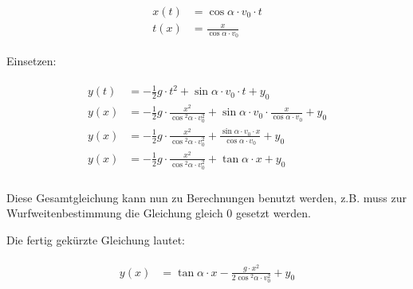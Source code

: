 \begin{align}
\begin{split}
	x(t) &= \cos{\alpha} \cdot v_0 \cdot t \\
	t(x) &= \frac{x}{\cos{\alpha} \cdot v_0}
\end{split}
\end{align}

\noindent Einsetzen:

\begin{align}
\begin{split}
	y(t) &= -\frac{1}{2}g \cdot t^2 + \sin{\alpha} \cdot v_0 \cdot t + y_0 \\
	y(x) &= -\frac{1}{2}g \cdot \frac{x^2}{\cos{^2\alpha} \cdot v_0^2} + \sin{\alpha} \cdot v_0 \cdot \frac{x}{\cos{\alpha} \cdot v_0} + y_0 \\
	y(x) &= -\frac{1}{2}g \cdot \frac{x^2}{\cos{^2\alpha} \cdot v_0^2} + \frac{\sin{\alpha} \cdot v_0 \cdot x}{\cos{\alpha} \cdot v_0} + y_0 \\
	y(x) &= -\frac{1}{2}g \cdot \frac{x^2}{\cos{^2\alpha} \cdot v_0^2} + \tan{\alpha} \cdot x + y_0 \\
\end{split}
\end{align}

\noindent Diese Gesamtgleichung kann nun zu Berechnungen benutzt werden, z.B. muss zur Wurfweitenbestimmung die Gleichung gleich $0$ gesetzt werden. 

Die fertig gekürzte Gleichung lautet:

\begin{align}
\begin{split}
	y(x) &= \tan{\alpha} \cdot x - \frac{g \cdot x^2}{2\cos{^2\alpha} \cdot v_0^2} + y_0
\end{split}
\end{align}